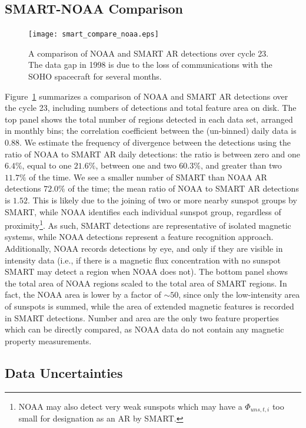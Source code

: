 \subsection{SMART-NOAA Comparison}\label{sect:noaacomp}

\begin{figure}[!ht]
\begin{center}
\texttt{[image: smart\_compare\_noaa.eps]}
\end{center}
\caption{A comparison of NOAA and SMART AR detections over cycle 23. The data gap in 1998 is due to the loss of communications with the SOHO spacecraft for several months.}\label{noaa_comp}
\end{figure}

Figure~\ref{noaa_comp} summarizes a comparison of NOAA and SMART AR detections over the cycle 23, including numbers of detections and total feature area on disk. The top panel shows the total number of regions detected in each data set, arranged in monthly bins; the correlation coefficient between the (un-binned) daily data is $0.88$. We estimate the frequency of divergence between the detections using the ratio of NOAA to SMART AR daily detections: the ratio is between zero and one $6.4\%$, equal to one $21.6\%$, between one and two $60.3\%$, and greater than two $11.7\%$ of the time. We see a smaller number of SMART than NOAA AR detections $72.0\%$ of the time; the mean ratio of NOAA to SMART AR detections is $1.52$. This is likely due to the joining of two or more nearby sunspot groups by SMART, while NOAA identifies each individual sunspot group, regardless of proximity\footnote{NOAA may also detect very weak sunspots which may have a $\Phi_{uns,t,i}$ too small for designation as an AR by SMART.}. As such, SMART detections are representative of isolated magnetic systems, while NOAA detections represent a feature recognition approach. Additionally, NOAA records detections by eye, and only if they are visible in intensity data (i.e., if there is a magnetic flux concentration with no sunspot SMART may detect a region when NOAA does not). The bottom panel shows the total area of NOAA regions scaled to the total area of SMART regions. In fact, the NOAA area is lower by a factor of $\sim$$50$, since only the low-intensity area of sunspots is summed, while the area of extended magnetic features is recorded in SMART detections. Number and area are the only two feature properties which can be directly compared, as NOAA data do not contain any magnetic property measurements.


\subsection{Data Uncertainties}\label{sect:mdiuncert}

